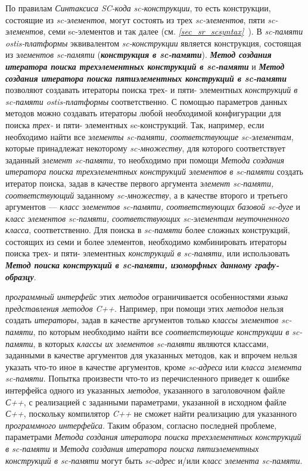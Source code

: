 По правилам \textit{Синтаксиса SC-кода} \textit{sc-конструкции}, то есть конструкции, состоящие из \textit{sc-элементов}, могут состоять из трех \textit{sc-элементов}, пяти \textit{sc-элементов}, семи sc-элементов и так далее (см. \textit{\ref{sec_sr_scsyntax}~}). В \textit{sc-памяти ostis-платформы} эквивалентом \textit{sc-конструкции} является конструкция, состоящая из \textit{элементов sc-памяти} (\textbf{\textit{конструкция в sc-памяти}}). \textbf{\textit{Метод создания итератора поиска трехэлементных конструкций в sc-памяти}} и \textbf{\textit{Метод создания итератора поиска пятиэлементных конструкций в sc-памяти}} позволяют создавать итераторы поиска трех- и пяти- элементных \textit{конструкций в sc-памяти ostis-платформы} соответственно. С помощью параметров данных методов можно создавать итераторы любой необходимой конфигурации для поиска \textit{трех-} и {пяти- элементных sc-конструкций}. Так, например, если необходимо найти все \textit{элементы sc-памяти, соответствующие sc-элементам}, которые принадлежат некоторому \textit{sc-множеству}, для которого соответствует заданный \textit{элемент sc-памяти}, то необходимо при помощи \textit{Метода создания итератора поиска трехэлементных конструкций элементов в sc-памяти} создать итератор поиска, задав в качестве первого аргумента \textit{элемент sc-памяти, соответствующий} заданному \textit{sc-множеству}, а в качестве второго и третьего аргументов --- \textit{класс элементов sc-памяти, соответствующих базовой sc-дуге\scnsupergroupsign} и \textit{класс элементов sc-памяти, соответствующих sc-элементам неуточненного класса\scnsupergroupsign}, соответственно. Для поиска в \textit{sc-памяти} более сложных конструкций, состоящих из семи и более элементов, необходимо комбинировать итераторы поиска трех- и пяти- элементных \textit{конструкций в sc-памяти}, или использовать \textbf{\textit{Метод поиска конструкций в sc-памяти, изоморфных данному графу-образцу}}.

\textit{программный интерфейс} этих \textit{методов} ограничивается особенностями \textit{языка представления методов} \textit{C++}. Например, при помощи этих \textit{методов} нельзя создать \textit{итераторы}, задав в качестве аргументов только \textit{классы элементов sc-памяти\scnsupergroupsign}, по которым необходимо найти все \textit{соответствующие конструкции в sc-памяти}, в которых \textit{классы их элементов sc-памяти\scnsupergroupsign} являются классами, заданными в качестве аргументов для указанных методов, как и впрочем нельзя указать что-то иное в качестве аргументов, кроме \textit{sc-адреса} или \textit{класса элемента sc-памяти\scnsupergroupsign}. Попытка произвести что-то из перечисленного приведет к ошибке  интерфейса одного из указанных \textit{методов}, указанного в заголовочном файле \textit{С++}, с реализацией с заданными параметрами, указанной в исходном файле \textit{С++}, поскольку компилятор \textit{C++} не сможет найти реализацию для указанного \textit{программного интерфейса}. Таким образом, согласно последней проблеме, параметрами \textit{Метода создания итератора поиска трехэлементных конструкций в sc-памяти} и \textit{Метода создания итератора поиска пятиэлементных конструкций в sc-памяти} могут быть \textit{sc-адрес} и/или \textit{класс элемента sc-памяти\scnsupergroupsign}.

